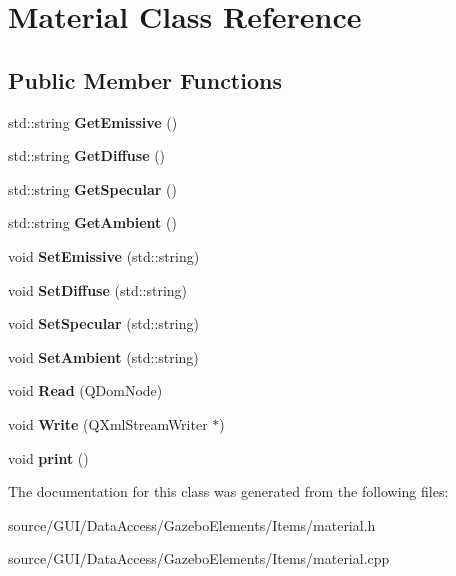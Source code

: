 \section{Material Class Reference}
\label{class_material}
\subsection*{Public Member Functions}
\begin{DoxyCompactItemize}
\item 
std\+::string {\bfseries Get\+Emissive} ()\label{class_material_ae32f05d715f240a29b242c04894f771d}

\item 
std\+::string {\bfseries Get\+Diffuse} ()\label{class_material_a4d51faeab8b528fc50897e46cdada81d}

\item 
std\+::string {\bfseries Get\+Specular} ()\label{class_material_aea88115f6887bd8a2ea70ea4165f11c8}

\item 
std\+::string {\bfseries Get\+Ambient} ()\label{class_material_a3e7bd98283fb2cf5f3d12c6428ba6f1d}

\item 
void {\bfseries Set\+Emissive} (std\+::string)\label{class_material_a41a290ce838802f5bd9045f36ea2034a}

\item 
void {\bfseries Set\+Diffuse} (std\+::string)\label{class_material_a7e3d2d3cd49ee1c94a51d38186562e58}

\item 
void {\bfseries Set\+Specular} (std\+::string)\label{class_material_a8a0e8372fa9b3685c34c47916752cf47}

\item 
void {\bfseries Set\+Ambient} (std\+::string)\label{class_material_a70035c0a78f768577dafb9f1a798104e}

\item 
void {\bfseries Read} (Q\+Dom\+Node)\label{class_material_ae3dc9354d6c5910bb7f7236c4c2e985f}

\item 
void {\bfseries Write} (Q\+Xml\+Stream\+Writer $\ast$)\label{class_material_a1530b8c71bf3949756507a5b01dacc77}

\item 
void {\bfseries print} ()\label{class_material_a36e8241b1150ec0ed4ecf797db5288d4}

\end{DoxyCompactItemize}


The documentation for this class was generated from the following files\+:\begin{DoxyCompactItemize}
\item 
source/\+G\+U\+I/\+Data\+Access/\+Gazebo\+Elements/\+Items/material.\+h\item 
source/\+G\+U\+I/\+Data\+Access/\+Gazebo\+Elements/\+Items/material.\+cpp\end{DoxyCompactItemize}
